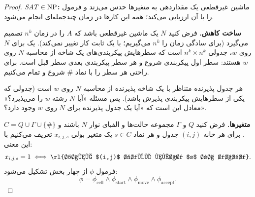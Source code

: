 \begin{proof}
\textbf{$\mathit{SAT}\in\mathrm{NP}$:} ماشین غیرقطعی یک مقداردهی به متغیرها حدس می‌زند و فرمول را با آن ارزیابی می‌کند؛ همه این کارها در زمان چندجمله‌ای انجام می‌شود.

\textbf{ساخت کاهش.} فرض کنید $N$ یک ماشین غیرقطعی باشد که $A$ را در زمان $n^k$ تصمیم می‌گیرد (برای سادگی زمان را $n^k$ می‌گیریم؛ با یک ثابت کار تغییر نمی‌کند). یک  برای $N$ روی $w$، جدولی $n^k\times n^k$ است که سطرهایش پیکربندی‌های یک شاخه از محاسبه $N$ روی $w$ هستند: سطر اول پیکربندی شروع و هر سطر پیکربندی بعدی سطر قبل است. برای راحتی هر سطر را با نماد $\#$ شروع و تمام می‌کنیم.
\begin{ltrfig}
\end{ltrfig}
هر جدول پذیرنده متناظر با یک شاخه پذیرنده از محاسبه $N$ روی $w$ است (جدولی که یکی از سطرهایش پیکربندی پذیرش باشد). پس مسئله «آیا $N$ رشته $w$ را می‌پذیرد؟» معادل این است که «آیا یک جدول پذیرنده برای $N$ روی $w$ وجود دارد؟».

\textbf{متغیرها.} فرض کنید $Q$ و $\Gamma$ مجموعه حالت‌ها و الفبای نوار $N$ باشند و $C=Q\cup\Gamma\cup\{\#\}$. برای هر خانه $(i,j)$ جدول و هر نماد $s\in C$ یک متغیر بولی $x_{i,j,s}$ تعریف می‌کنیم با این معنی:
\[x_{i,j,s}=1\iff\text{\rl{خانه $(i,j)$ جدول نماد $s$ را دارد}}.\]
فرمول $\phi$ از چهار بخش تشکیل می‌شود:
\[\phi=\phi_{\mathrm{cell}}\wedge\phi_{\mathrm{start}}\wedge\phi_{\mathrm{move}}\wedge\phi_{\mathrm{accept}}.\]


\end{proof}
